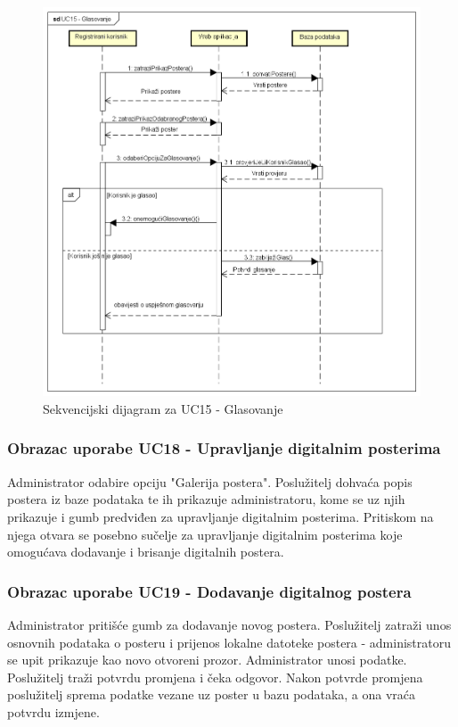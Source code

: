 				\begin{figure}[hp!]
				\includegraphics[width=\linewidth]{Slike/SD_Glasanje.png}
				\caption{Sekvencijski dijagram za UC15 - Glasovanje}
				\end{figure}
				
				\newpage
				
				\subsubsection{Obrazac uporabe UC18 - Upravljanje digitalnim posterima}
				Administrator odabire opciju "Galerija postera". Poslužitelj dohvaća popis postera iz baze podataka te ih prikazuje administratoru, kome se uz njih prikazuje i gumb predviđen za upravljanje digitalnim posterima. Pritiskom na njega otvara se posebno sučelje za upravljanje digitalnim posterima koje omogućava dodavanje i brisanje digitalnih postera.
				
				\subsubsection{Obrazac uporabe UC19 - Dodavanje digitalnog postera}
				Administrator pritišće gumb za dodavanje novog postera. Poslužitelj zatraži unos osnovnih podataka o posteru i  prijenos lokalne datoteke postera - administratoru se upit prikazuje kao novo otvoreni prozor. Administrator unosi podatke. Poslužitelj traži potvrdu promjena i čeka odgovor. Nakon potvrde promjena poslužitelj sprema podatke vezane uz poster u bazu podataka, a ona vraća potvrdu izmjene.
				

